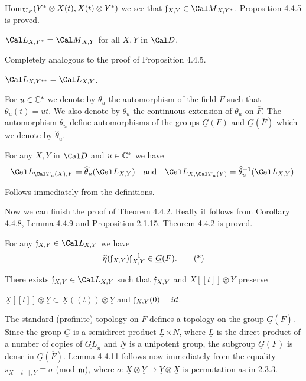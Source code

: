 \noindent
Hom$_{{\bold U}_F}(Y^* \otimes X(t),
X(t) \otimes Y^*)$  we see that ${\frak f}_{X,Y} \in {\Cal M}_{X,Y^*}$.
Proposition 4.4.5 is proved.

  ${\Cal L}_{X,Y^*} = {\Cal M}_{X,Y}$  for
all $X,Y$ in ${\Cal D}$.
\endproclaim

  Completely analogous to the proof of Proposition 4.4.5.
\enddemo

  ${\Cal L}_{X,Y^{**}} = {\Cal L}_{X,Y}$.
\endproclaim

  For  $u \in {\Bbb C}^*$  we denote by  $\theta_u$  the
automorphism of the field $F$  such that  $\theta_u(t) = ut$.  We also denote
by  $\theta_u$  the continuous extension of  $\theta_u$  on $\overline{F}$.
The
automorphism  $\theta_u$  define automorphisms of the groups
$\underline{G}(F)$
and  $\underline{G}(\overline{F})$  which we denote by  $\widehat{\theta}_u$.

  For any  $X,Y$ in ${\Cal D}$  and  $u \in {\Bbb C}^*$  we
have
$$
{\Cal L}_{{\Cal T}_u(X),Y} = \widehat{\theta}_u({\Cal L}_{X,Y})\quad
\text{and}\quad
{\Cal L}_{X, {\Cal T}_u(Y)} = \widehat{\theta}_u^{-1}({\Cal L}_{X,Y}).
$$
\endproclaim

  Follows immediately from the definitions.
\enddemo

  Now we can finish the proof of Theorem 4.4.2.  Really
it follows
from Corollary 4.4.8, Lemma 4.4.9 and Proposition 2.1.15.  Theorem 4.4.2 is
proved.

  For any  ${\frak f}_{X,Y} \in {\Cal L}_{X,Y}$  we have
$$
\widehat{\eta}({\frak f}_{X,Y}){\frak f}^{-1}_{X,Y} \in \underline{G}(F).
\tag *
$$
\endproclaim

  There exists  ${\frak f}_{X,Y} \in {\Cal
L}_{X,Y}$
such that  ${\frak f}_{X,Y}$  and $\underline{X}[[t]] \otimes \underline{Y}$
preserve

\noindent
$\underline{X}[[t]] \otimes \underline{Y} \subset \underline{X}((t))
\otimes \underline{Y}$  and  ${\frak f}_{X,Y}(0) = id$.
\endproclaim

  The standard (profinite) topology on $\overline{F}$  defines a
topology on the group  $\underline{G}(\overline{F})$.  Since the group
$\underline{G}$  is a semidirect product $\underline{L} \ltimes N$, where
$\underline{L}$  is the direct product of a number of copies of
$\underline{GL}_n$
and  $\underline{N}$  is a unipotent group, the subgroup $\underline{G}(F)$  is
dense in $\underline{G}(\overline{F})$.  Lemma 4.4.11 follows now immediately
from the equality  $s_{X[[t]],Y} \equiv \sigma$ (mod ${\frak m}$), where
$\sigma: \underline{X} \otimes \underline{Y} \to \underline{Y} \otimes
\underline{X}$
is permutation as in 2.3.3.
\enddemo

